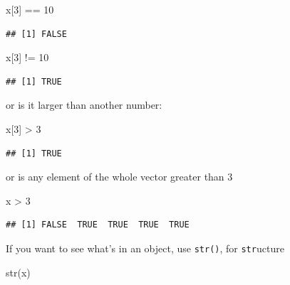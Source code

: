 \documentclass[
]{article}
\newenvironment{Shaded}{\begin{snugshade}}{\end{snugshade}}
\newcommand{\DecValTok}[1]{\textcolor[rgb]{0.00,0.00,0.81}{#1}}
\newcommand{\FunctionTok}[1]{\textcolor[rgb]{0.00,0.00,0.00}{#1}}
\newcommand{\NormalTok}[1]{#1}
\newcommand{\SpecialCharTok}[1]{\textcolor[rgb]{0.00,0.00,0.00}{#1}}
\begin{document}
\begin{Shaded}
\begin{Highlighting}[]
\NormalTok{x[}\DecValTok{3}\NormalTok{] }\SpecialCharTok{==} \DecValTok{10}
\end{Highlighting}
\end{Shaded}

\begin{verbatim}
## [1] FALSE
\end{verbatim}

\begin{Shaded}
\begin{Highlighting}[]
\NormalTok{x[}\DecValTok{3}\NormalTok{] }\SpecialCharTok{!=} \DecValTok{10}
\end{Highlighting}
\end{Shaded}

\begin{verbatim}
## [1] TRUE
\end{verbatim}

or is it larger than another number:

\begin{Shaded}
\begin{Highlighting}[]
\NormalTok{x[}\DecValTok{3}\NormalTok{] }\SpecialCharTok{\textgreater{}} \DecValTok{3}
\end{Highlighting}
\end{Shaded}

\begin{verbatim}
## [1] TRUE
\end{verbatim}

or is any element of the whole vector greater than 3

\begin{Shaded}
\begin{Highlighting}[]
\NormalTok{x }\SpecialCharTok{\textgreater{}} \DecValTok{3}
\end{Highlighting}
\end{Shaded}

\begin{verbatim}
## [1] FALSE  TRUE  TRUE  TRUE  TRUE
\end{verbatim}

If you want to see what's in an object, use \texttt{str()}, for \texttt{str}ucture

\begin{Shaded}
\begin{Highlighting}[]
\FunctionTok{str}\NormalTok{(x)}
\end{Highlighting}
\end{Shaded}
\end{document}
